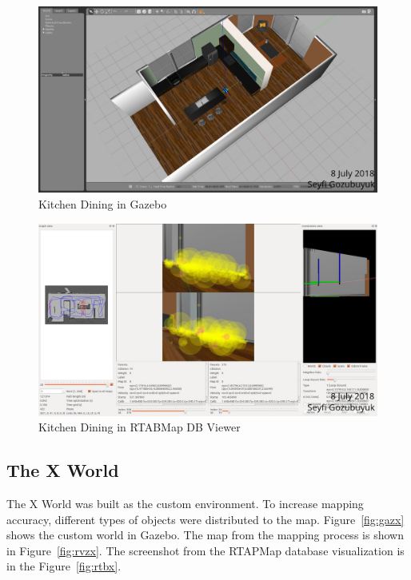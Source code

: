 \documentclass[10pt,journal,compsoc]{IEEEtran}
\begin{document}
\begin{figure}[thpb]
      \centering
      \includegraphics[width=\linewidth]{figures/gazebo_kitchen.png}
      \caption{Kitchen Dining in Gazebo}
      \label{fig:gazkit}
\end{figure}

\begin{figure}[thpb]
      \centering
      \includegraphics[width=\linewidth]{figures/rtabmap_kitchen.png}
      \caption{Kitchen Dining in RTABMap DB Viewer}
      \label{fig:rtbkit}
\end{figure}

\subsection{The X World}
The X World was built as the custom environment. To increase mapping accuracy, different types of objects were distributed to the map. Figure~\ref{fig:gazx} shows the custom world in Gazebo. The map from the mapping process is shown in Figure~\ref{fig:rvzx}. The screenshot from the RTAPMap database visualization is in the Figure~\ref{fig:rtbx}.
\end{document}

